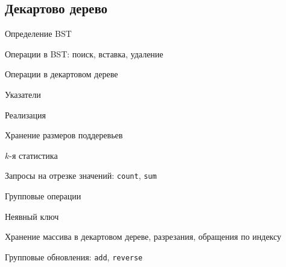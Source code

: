 \documentclass[a4paper,12pt]{article}
\begin{document}
\begin{multicols}{2}
    \subsection{Декартово дерево}
      \begin{compactenum}
        \item Определение BST
        \item Операции в BST: поиск, вставка, удаление
        \item Операции в декартовом дереве
        \item Указатели
        \item Реализация
        \item Хранение размеров поддеревьев
        \item $k$-я статистика
        \item Запросы на отрезке значений: \texttt{count}, \texttt{sum}
        \item Групповые операции
        \item Неявный ключ
        \item Хранение массива в декартовом дереве, разрезания, обращения по индексу
        \item Групповые обновления: \texttt{add}, \texttt{reverse}
      \end{compactenum}


\end{multicols}
\end{document}
